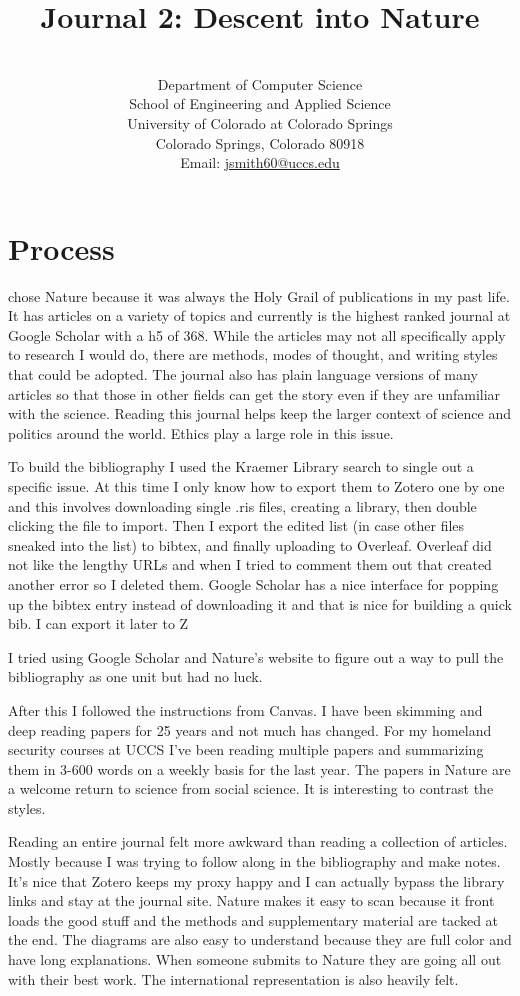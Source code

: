 \documentclass{article}
\title{Journal 2: Descent into Nature}
\author{\myname\\
Department of Computer Science\\School of Engineering and Applied Science\\University of Colorado at Colorado Springs\\Colorado Springs, Colorado 80918\\Email: \href{mailto:jsmith@uccs.edu}{jsmith60@uccs.edu}}
\begin{document}
\maketitle
\section{Process}
\lettrine[findent=2pt]{}{ }chose Nature \cite{nature} because it was always the Holy Grail of publications in my past life. It has articles on a variety of topics and currently is the highest ranked journal at Google Scholar with a h5 of 368. While the articles may not all specifically apply to research I would do, there are methods, modes of thought, and writing styles that could be adopted. The journal also has plain language versions of many articles so that those in other fields can get the story even if they are unfamiliar with the science. Reading this journal helps keep the larger context of science and politics around the world. Ethics play a large role in this issue.

To build the bibliography I used the Kraemer Library search to single out a specific issue. At this time I only know how to export them to Zotero one by one and this involves downloading single .ris files, creating a library, then double clicking the file to import. Then I export the edited list (in case other files sneaked into the list) to bibtex, and finally uploading to Overleaf. Overleaf did not like the lengthy URLs and when I tried to comment them out that created another error so I deleted them. Google Scholar has a nice interface for popping up the bibtex entry instead of downloading it and that is nice for building a quick bib. I can export it later to Z

I tried using Google Scholar and Nature's website to figure out a way to pull the bibliography as one unit but had no luck.

After this I followed the instructions from Canvas. I have been skimming and deep reading papers for 25 years and not much has changed. For my homeland security courses at UCCS I've been reading multiple papers and summarizing them in 3-600 words on a weekly basis for the last year. The papers in Nature are a welcome return to science from social science. It is interesting to contrast the styles.

Reading an entire journal felt more awkward than reading a collection of articles. Mostly because I was trying to follow along in the bibliography and make notes. It's nice that Zotero keeps my proxy happy and I can actually bypass the library links and stay at the journal site. Nature makes it easy to scan because it front loads the good stuff and the methods and supplementary material are tacked at the end. The diagrams are also easy to understand because they are full color and have long explanations. When someone submits to Nature they are going all out with their best work. The international representation is also heavily felt.
\end{document}
